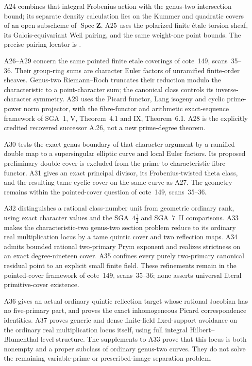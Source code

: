 A24 combines that integral Frobenius action with the genus-two
intersection bound; its separate density calculation lies on the
Kummer and quadratic covers of an open subscheme of
$\operatorname{Spec}\mathbf Z$. A25 uses the polarized finite
\'etale torsion sheaf, its Galois-equivariant Weil pairing, and
the same weight-one point bounds. The precise pairing locator is
\cite[\S16 and Lemma~16.2(e)]{MilneAV}.

A26--A29 concern the same pointed finite etale coverings of cote~149,
scans~35--36. Their group-ring sums are character Euler factors of
unramified finite-order sheaves. Genus-two Riemann--Roch truncates their
reduction modulo the characteristic to a point-character sum; the
canonical class controls its inverse-character symmetry. A29 uses
the Picard functor, Lang isogeny and cyclic prime-power norm projector,
with the fibre-functor and arithmetic exact-sequence framework of
SGA~1, V, Theorem~4.1 and IX, Theorem~6.1. A28 is the explicitly
credited recovered successor A.26, not a new prime-degree theorem.

A30 tests the exact genus boundary of that character argument by a
ramified double map to a supersingular elliptic curve and local Euler
factors. Its proposed preliminary double cover is excluded from the
prime-to-characteristic fibre functor. A31 gives an exact principal
divisor, its Frobenius-twisted theta class, and the resulting tame cyclic
cover on the same curve as A27. The geometry remains within the
pointed-cover question of cote~149, scans~35--36.

A32 distinguishes a rational class-number unit from geometric ordinary rank,
using exact character values and the SGA~$4\frac12$ and SGA~7~II comparisons.
A33 makes the characteristic-two genus-two section problem reduce to its
ordinary real multiplication locus by a tame quintic cover and two reflection
maps. A34 admits bounded rational two-primary Prym exponent and realizes
strictness on an exact degree-nineteen cover. A35 confines every purely
two-primary canonical residual point to an explicit small finite field.
These refinements remain in the pointed-cover framework of cote~149,
scans~35--36; none asserts universal literal primitive-cover existence.

A36 gives an actual ordinary quintic reflection target whose rational
Jacobian has no five-primary part, and proves the exact inhomogeneous
Picard correspondence identities. A37 proves generic and dense
finite-field fixed-support avoidance on the ordinary real multiplication
locus itself, using full integral Hilbert--Blumenthal level structure.
The supplements to A33 prove that this locus is both nonempty and a
proper subclass of ordinary genus-two curves. They do not solve the
remaining variable-prime or prescribed-image separation problem.

